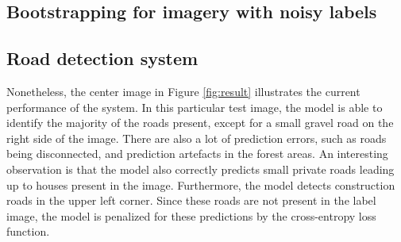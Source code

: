 \subsection{Bootstrapping for imagery with noisy labels}
\label{sec:results_bootstrapping}


\subsection{Road detection system}
\label{sec:results_road_detection_system}
Nonetheless, the center image in Figure \ref{fig:result} illustrates the current performance of the system. In this particular test image, the model is able to identify the majority of the roads present, except for a small gravel road on the right side of the image. There are also a lot of prediction errors, such as roads being disconnected, and prediction artefacts in the forest areas. An interesting observation is that the model also correctly predicts small private roads leading up to houses present in the image. Furthermore, the model detects construction roads in the upper left corner. Since these roads are not present in the label image, the model is penalized for these predictions by the cross-entropy loss function.\\

